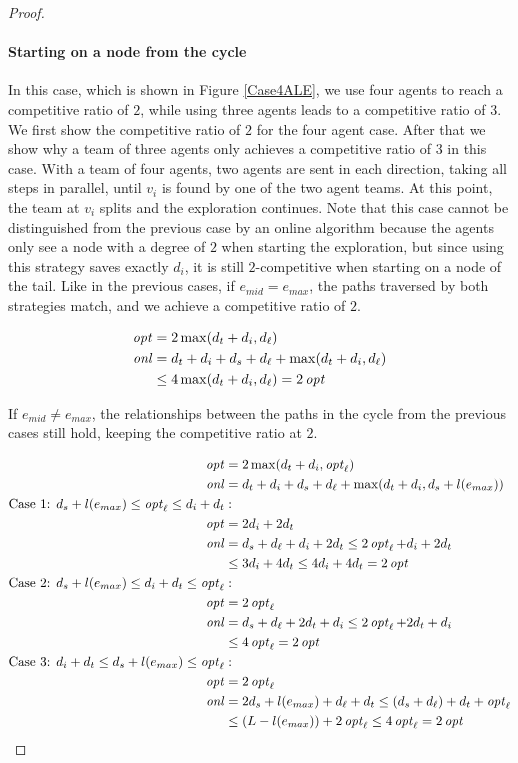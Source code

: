 \begin{proof}
\paragraph*{Starting on a node from the cycle}
In this case, which is shown in Figure \ref{Case4ALE}, we use four agents to reach a competitive ratio of $2$, while using three agents leads to a competitive ratio of $3$. We first show the competitive ratio of $2$
for the four agent case. After that we show why a team of three agents only achieves a competitive ratio of $3$ in this case. With a team of four agents, two agents are sent in each direction, taking
all steps in parallel, until $v_i$ is found by one of the two agent teams. At this point, the team at $v_i$ splits and the exploration continues. Note that this case cannot be distinguished from the previous case
by an online algorithm because the agents only see a node with a degree of $2$ when starting the exploration, but since using this strategy saves exactly $d_i$, it is still $2$-competitive when
starting on a node of the tail. Like in the previous cases, if $e_{mid} = e_{max}$, the paths traversed by both strategies match, and we achieve a competitive ratio of $2$.
 
\begin{align*}
    \small
    \mathop{\mathit{opt}}\nolimits &= 2\max(d_t + d_i, d_\ell)\\
    \mathop{\mathit{onl}}\nolimits &= d_t + d_i + d_s + d_\ell + \max(d_t + d_i, d_\ell)\\
    &\leq 4\max(d_t + d_i, d_\ell) = 2\mathop{\mathit{opt}}\nolimits\\
\end{align*}

If $e_{mid} \neq e_{max}$, the relationships between the paths in the cycle from the previous cases still hold, keeping the competitive ratio at $2$.

\begin{align*}
    \small
    \mathop{\mathit{opt}}\nolimits &= 2\max(d_t + d_i, \mathop{\mathit{opt}}\nolimits_\ell)\\
    \mathop{\mathit{onl}}\nolimits &= d_t + d_i + d_s + d_\ell + \max(d_t + d_i, d_s + l(e_{max}))\\
    \text{Case 1: } d_s + l(e_{max}) \leq \mathop{\mathit{opt}}\nolimits_\ell \leq d_i + d_t&:\\
    \mathop{\mathit{opt}}\nolimits &= 2d_i + 2d_t\\
    \mathop{\mathit{onl}}\nolimits &= d_s + d_\ell + d_i + 2d_t \leq 2\mathop{\mathit{opt}}\nolimits_\ell + d_i + 2d_t\\
    &\leq 3d_i + 4d_t \leq 4d_i + 4d_t = 2\mathop{\mathit{opt}}\nolimits\\
    \text{Case 2: } d_s + l(e_{max}) \leq d_i + d_t \leq \mathop{\mathit{opt}}\nolimits_\ell&:\\
    \mathop{\mathit{opt}}\nolimits &= 2\mathop{\mathit{opt}}\nolimits_\ell\\
    \mathop{\mathit{onl}}\nolimits &= d_s + d_\ell + 2d_t + d_i \leq 2\mathop{\mathit{opt}}\nolimits_\ell + 2d_t + d_i\\
    &\leq 4\mathop{\mathit{opt}}\nolimits_\ell = 2\mathop{\mathit{opt}}\nolimits\\
    \text{Case 3: } d_i + d_t \leq d_s + l(e_{max}) \leq \mathop{\mathit{opt}}\nolimits_\ell&:\\
    \mathop{\mathit{opt}}\nolimits &= 2\mathop{\mathit{opt}}\nolimits_\ell\\
    \mathop{\mathit{onl}}\nolimits &= 2d_s + l(e_{max}) + d_\ell + d_t \leq (d_s + d_\ell) + d_t + \mathop{\mathit{opt}}\nolimits_\ell\\
    &\leq (L - l(e_{max})) + 2\mathop{\mathit{opt}}\nolimits_\ell \leq 4\mathop{\mathit{opt}}\nolimits_\ell = 2\mathop{\mathit{opt}}\nolimits
\end{align*}


\end{proof}
